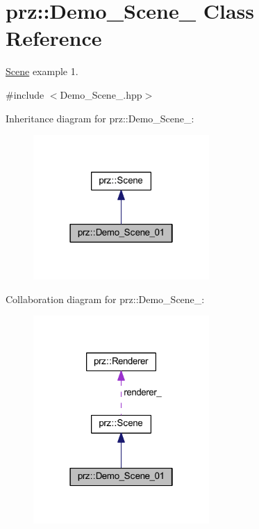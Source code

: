 \hypertarget{classprz_1_1_demo___scene__01}{}\section{prz\+::Demo\+\_\+\+Scene\+\_ Class Reference}
\label{classprz_1_1_demo___scene__01}


\mbox{\hyperlink{classprz_1_1_scene}{Scene}} example 1.  




{\ttfamily \#include $<$Demo\+\_\+\+Scene\+\_.\+hpp$>$}



Inheritance diagram for prz\+::Demo\+\_\+\+Scene\+\_\+:
\nopagebreak
\begin{figure}[H]
\begin{center}
\leavevmode
\includegraphics[width=190pt]{classprz_1_1_demo___scene__01__inherit__graph}
\end{center}
\end{figure}


Collaboration diagram for prz\+::Demo\+\_\+\+Scene\+\_\+:
\nopagebreak
\begin{figure}[H]
\begin{center}
\leavevmode
\includegraphics[width=190pt]{classprz_1_1_demo___scene__01__coll__graph}
\end{center}
\end{figure}
